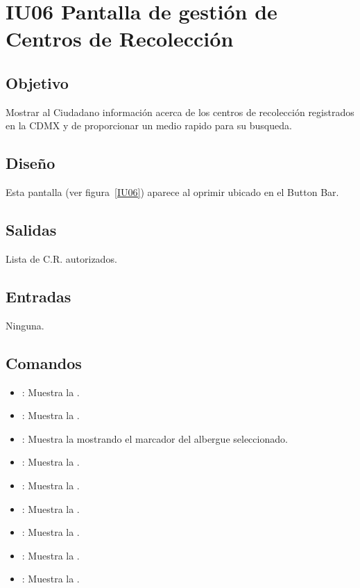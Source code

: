 \section{IU06 Pantalla de gestión de Centros de Recolección}

\subsection{Objetivo}
	Mostrar al Ciudadano información acerca de los centros de recolección registrados en la CDMX y de proporcionar un medio rapido para su busqueda.

\subsection{Diseño}
	Esta pantalla  (ver figura~\ref{IU06}) aparece al oprimir  ubicado en el Button Bar.
	

\subsection{Salidas}
	Lista de C.R. autorizados.

\subsection{Entradas}
	Ninguna.

\subsection{Comandos}
\begin{itemize}
	\item {}: Muestra la .
	\item {}: Muestra la .
	\item {}: Muestra la  mostrando el marcador del albergue seleccionado.
	\item {}: Muestra la .
	\item {}: Muestra la .
	\item {}: Muestra la .
	\item {}: Muestra la .
	\item {}: Muestra la .
	\item {}: Muestra la .
\end{itemize}

